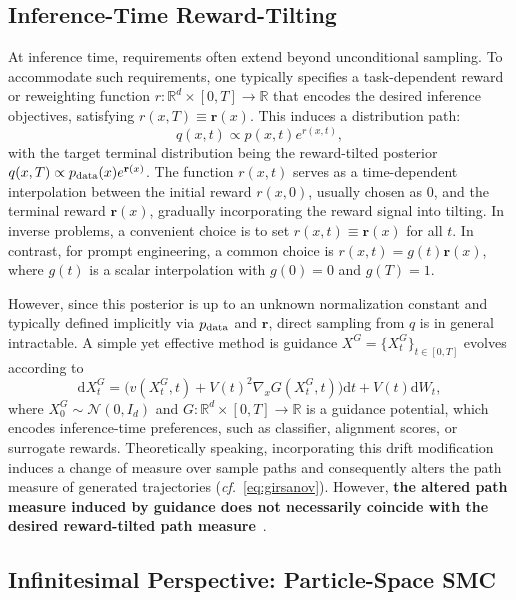 \documentclass{article}
\theoremstyle{plain}
\theoremstyle{definition}
\theoremstyle{remark}
\newcommand{\dif}{{\mathrm{d}}}
\newcommand{\R}{{\mathbb{R}}}
\begin{document}
\subsection{Inference-Time Reward-Tilting}

At inference time, requirements often extend beyond unconditional sampling. To accommodate such requirements, one typically specifies a task-dependent reward or reweighting function \( r : \R^d \times [0,T] \to \R \) that encodes the desired inference objectives, satisfying \(r(x,T)\equiv \mathbf{r}(x)\). This induces a distribution path:
\begin{equation}
    q(x, t) \propto p(x, t) e^{r(x, t)},
    \label{eq:reward_tilted_path}
\end{equation}
with the target terminal distribution being the reward-tilted posterior $q(x,T) \propto p_{\rm data}(x) e^{\mathbf{r}(x)}$. The function \(r(x,t)\) serves as a time-dependent interpolation between the initial reward $r(x,0)$, usually chosen as $0$, and the terminal reward \(\mathbf r(x)\), gradually incorporating the reward signal into tilting. In inverse problems, a convenient choice is to set \(r(x,t)\equiv \mathbf{r}(x)\) for all \(t\). In contrast, for prompt engineering, a common choice is \(r(x,t) = g(t)\mathbf r(x)\), where \(g(t)\) is a scalar interpolation with \(g(0)=0\) and \(g(T)=1\).

However, since this posterior is up to an unknown normalization constant and typically defined implicitly via \(p_{\rm data}\) and \(\mathbf r\), direct sampling from \(q\) is in general intractable. A simple yet effective method is guidance
$X^{G}=\{X_t^{G}\}_{t\in[0,T]}$ evolves according to
\begin{equation}
\dif X_t^{G}
=
\bigl(v(X_t^{G},t) + V(t)^2 \nabla_x G(X_t^{G},t)\bigr)\dif t
+ V(t)\dif W_t,
\label{eq:guided_sde}
\end{equation}
where $X_0^{G} \sim \mathcal{N}(0,I_d)$ and $G:\R^d\times [0,T]\to\R$ is a guidance potential, which encodes inference-time preferences, such as classifier, alignment scores, or surrogate rewards. Theoretically speaking, incorporating this drift modification induces a change of measure over sample paths and consequently alters the path measure of generated trajectories (\emph{cf.}~\eqref{eq:girsanov}). However, \textbf{the altered path measure induced by guidance does not necessarily coincide with the desired reward-tilted path measure}~\cite{chidambaram2024does}. 


\subsection{Infinitesimal Perspective: Particle-Space SMC}
\end{document}
